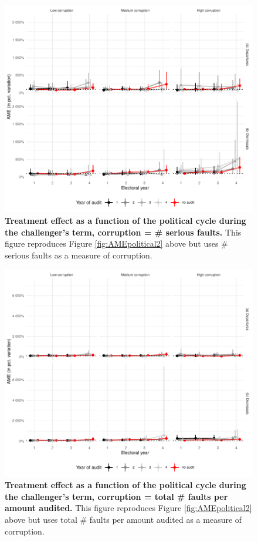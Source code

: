 \documentclass[12pt,a4paper]{article}
\theoremstyle{definition}
\begin{document}
{\begin{figure}[H]
    \centering
    \includegraphics{figures/AMEpoliticalSerious_term2Client.pdf}
    \caption{{\bf Treatment effect as a function of the political cycle during the challenger's term, corruption = \# serious faults.} This figure reproduces Figure \ref{fig:AMEpolitical2} above but uses \# serious faults as a measure of corruption.}
    \label{fig:AMEpolitical2_serious}
\end{figure}

\begin{figure}[H]
   \centering
   \includegraphics{figures/AMEpoliticalAllPerAMount_term2Client.pdf}
   \caption{{\bf Treatment effect as a function of the political cycle during the challenger's term, corruption = total \# faults per amount audited.} This figure reproduces Figure \ref{fig:AMEpolitical2} above but uses total \# faults per amount audited as a measure of corruption.}
   \label{fig:AMEpolitical2_allPerAmount}
\end{figure}

}
\end{document}
